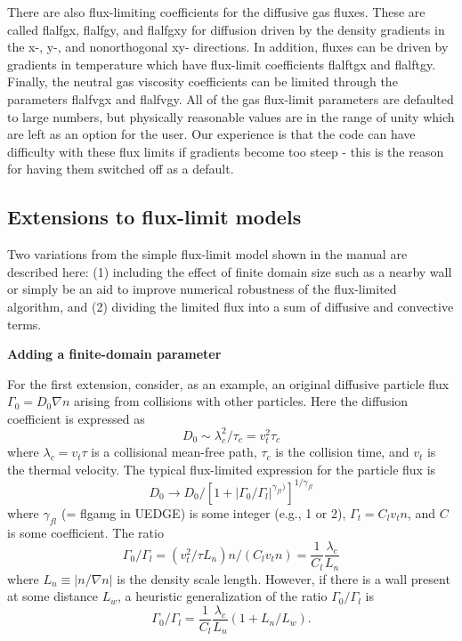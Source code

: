 \documentclass [12pt]{article}
\begin{document}
There are also flux-limiting coefficients for the diffusive gas fluxes.  These
are called {\sf flalfgx}, {\sf flalfgy}, and {\sf flalfgxy} for diffusion
driven by the density gradients in the x-, y-, and nonorthogonal xy-
directions.  In addition, fluxes can be driven by gradients in temperature
which have flux-limit coefficients {\sf flalftgx} and {\sf flalftgy}.
Finally, the neutral gas viscosity coefficients can be limited through the
parameters {\sf flalfvgx} and {\sf flalfvgy}.  All of the gas flux-limit
parameters are defaulted to large numbers, but physically reasonable values
are in the range of unity which are left as an option for the user.  Our
experience is that the code can have difficulty with these flux limits if
gradients become too steep - this is the reason for having them switched off
as a default.

\subsection{Extensions to flux-limit models}
 Two
variations from the simple flux-limit model shown in the manual are
described here: (1) including the effect of finite domain size such as
a nearby wall or simply be an aid to improve numerical robustness of
the flux-limited algorithm, and (2) dividing the limited flux into a
sum of diffusive and convective terms.

\noindent
{\bf Adding a finite-domain parameter}

For the first extension, consider, as an example, an original
diffusive particle flux $\Gamma_0 = D_0 \nabla n$ arising from
collisions with other particles.  Here the diffusion coefficient is
expressed as
\begin{equation}
    D_0 \sim \lambda_c^2/\tau_c = v_t^2 \tau_c
\end{equation}
where $\lambda_c = v_t \tau$ is a collisional mean-free path, $\tau_c$
is the collision time, and $v_t$ is the thermal velocity.  The typical
flux-limited expression for the particle flux is
\begin{equation}
   D_0 \rightarrow D_0 / [1 +
   |\Gamma_0/\Gamma_l|^{\gamma_{fl})}]^{1/\gamma_{fl}}
\end{equation}
where $\gamma_{fl}$ ({\sf = flgamg} in {\sf UEDGE}) is some integer
(e.g., 1 or 2), $\Gamma_t = C_l v_t n$, and $C$ is some coefficient.
The ratio
\begin{equation}
    \Gamma_0/\Gamma_l = (v_t^2/\tau L_n) n /(C_l v_t n) =
    \frac{1}{C_l} \frac{\lambda_c}{L_n}
\end{equation}
where $L_n \equiv | n / \nabla n |$ is the density scale length.
However, if there is a wall present at some distance $L_w$, a
heuristic generalization of the ratio $\Gamma_0/\Gamma_l$ is
\begin{equation}
     \Gamma_0/\Gamma_l = \frac{1}{C_l} \frac{\lambda_c}{L_n} (1 +
     L_n/L_w).
\end{equation}
\end{document}
